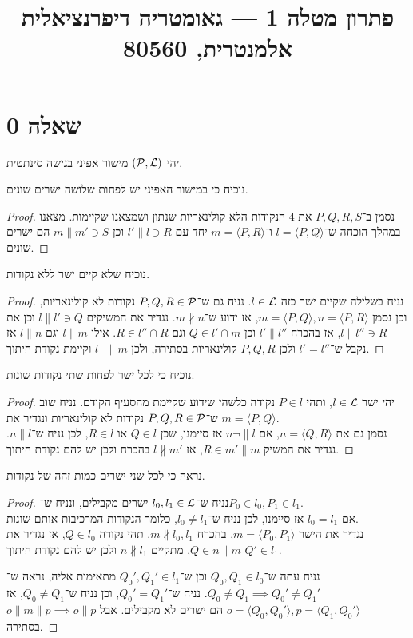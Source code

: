 
\title{פתרון מטלה 1 --- גאומטריה דיפרנציאלית אלמנטרית, 80560}


\maketitle
\maketitleprint[purple]

\section{שאלה 0}
יהי $(\mathcal{P}, \mathcal{L})$ מישור אפיני בגישה סינתטית.

\subquestion{}
נוכיח כי במישור האפיני יש לפחות שלושה ישרים שונים.
\begin{proof}
	נסמן ב־$P, Q, R, S$ את 4 הנקודות הלא קולינאריות שנתון ושמצאנו שקיימות.
	מצאנו במהלך הוכחה ש־$l = \langle P, Q \rangle$ ו־$m = \langle P, R \rangle$ יחד עם $l' \parallel l \ni R$ וכן $m \parallel m' \ni S$ הם ישרים שונים.
\end{proof}

\subquestion{}
נוכיח שלא קיים ישר ללא נקודות.
\begin{proof}
	נניח בשלילה שקיים ישר כזה $l \in \mathcal{L}$.
	נניח גם ש־$P, Q, R \in \mathcal{P}$ נקודות לא קולינאריות, וכן נסמן $m = \langle P, Q \rangle, n = \langle P, R \rangle$, אז ידוע ש־$m \not\parallel n$.
	נגדיר את המשיקים $l \parallel l' \ni Q$ וכן את $l \parallel l'' \ni R$, אז בהכרח $l' \parallel l''$ וכן $Q \in l' \cap m$ וגם $R \in l'' \cap R$.
	אילו $l \parallel m$ וגם $l \parallel n$ אז נקבל ש־$l' = l''$ ולכן $P, Q, R$ קולינאריות בסתירה, ולכן $l \lnot\parallel m$ וקיימת נקודת חיתוך.
\end{proof}

\subquestion{}
נוכיח כי לכל ישר לפחות שתי נקודות שונות.
\begin{proof}
	יהי ישר $l \in \mathcal{L}$, ותהי $P \in l$ נקודה כלשהי שידוע שקיימת מהסעיף הקודם.
	נניח שוב ש־$P, Q, R \in \mathcal{P}$ נקודות לא קולינאריות ונגדיר את $m = \langle P, Q \rangle$. \\
	נסמן גם את $n = \langle Q, R \rangle$, אם $n \lnot\parallel l$ אז סיימנו, שכן $Q \in l$ או $R \in l$, לכן נניח ש־$n \parallel l$.
	נגדיר את המשיק $R \in m' \parallel m$, אז $l \not\parallel m'$ בהכרח ולכן יש להם נקודת חיתוך.
\end{proof}

\subquestion{}
נראה כי לכל שני ישרים כמות זהה של נקודות.
\begin{proof}
	נניח ש־$l_0, l_1 \in \mathcal{L}$ ישרים מקבילים, ונניח ש־$P_0 \in l_0, P_1 \in l_1$. \\
	אם $l_0 = l_1$ אז סיימנו, לכן נניח ש־$l_0 \ne l_1$, כלומר הנקודות המרכיבות אותם שונות. \\
	נגדיר את הישר $m = \langle P_0, P_1 \rangle$, בהכרח $m \not\parallel l_0, l_1$.
	תהי נקודה $Q \in l_0$, אז נגדיר את $Q \in n \parallel m$, מתקיים $n \not\parallel l_1$ ולכן יש להם נקודת חיתוך $Q' \in l_1$. 

	נניח עתה ש־$Q_0, Q_1 \in l_0$ וכן ש־$Q_0', Q_1' \in l_1$ מתאימות אליה, נראה ש־$Q_0 \ne Q_1 \implies Q_0' \ne Q_1'$.
	נניח ש־$Q_0' = Q_1'$, וכן נניח ש־$Q_0 \ne Q_1$, אז $o = \langle Q_0, Q_0' \rangle, p = \langle Q_1, Q_0' \rangle$ הם ישרים לא מקבילים.
	אבל $o \parallel m \parallel p \implies o \parallel p$ בסתירה.
\end{proof}


